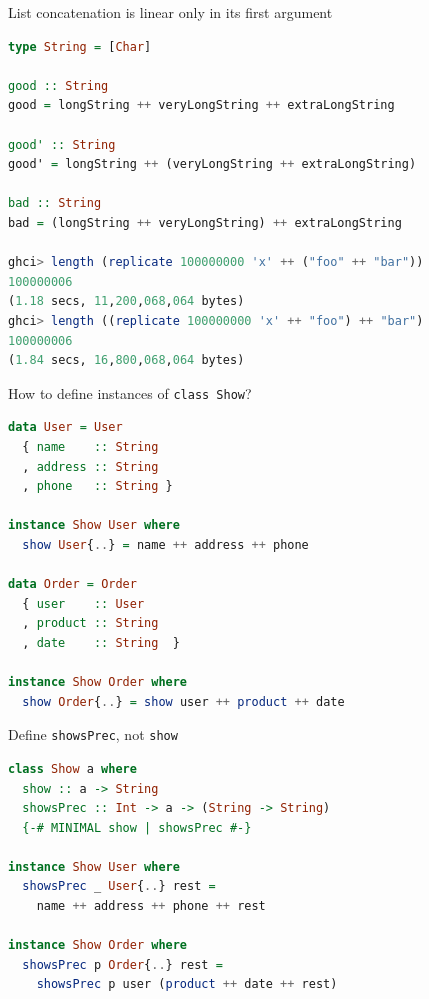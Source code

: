 \documentclass[handout]{beamer}
\begin{document}
\begin{frame}[fragile]{List concatenation is linear only in its first argument}

\begin{lstlisting}[language=Haskell]
type String = [Char]

good :: String
good = longString ++ veryLongString ++ extraLongString

good' :: String
good' = longString ++ (veryLongString ++ extraLongString)

bad :: String
bad = (longString ++ veryLongString) ++ extraLongString

ghci> length (replicate 100000000 'x' ++ ("foo" ++ "bar"))
100000006
(1.18 secs, 11,200,068,064 bytes)
ghci> length ((replicate 100000000 'x' ++ "foo") ++ "bar")
100000006
(1.84 secs, 16,800,068,064 bytes)
\end{lstlisting}

\end{frame}

\begin{frame}[fragile]{How to define instances of {\tt class Show}?}

\begin{lstlisting}[language=Haskell]
data User = User
  { name    :: String
  , address :: String
  , phone   :: String }

instance Show User where
  show User{..} = name ++ address ++ phone

data Order = Order
  { user    :: User
  , product :: String
  , date    :: String  }

instance Show Order where
  show Order{..} = show user ++ product ++ date
\end{lstlisting}

\end{frame}

\begin{frame}[fragile]{Define {\tt showsPrec}, not {\tt show}}

\begin{lstlisting}[language=Haskell]
class Show a where
  show :: a -> String
  showsPrec :: Int -> a -> (String -> String)
  {-# MINIMAL show | showsPrec #-}

instance Show User where
  showsPrec _ User{..} rest =
    name ++ address ++ phone ++ rest

instance Show Order where
  showsPrec p Order{..} rest =
    showsPrec p user (product ++ date ++ rest)
\end{lstlisting}

\end{frame}
\end{document}
